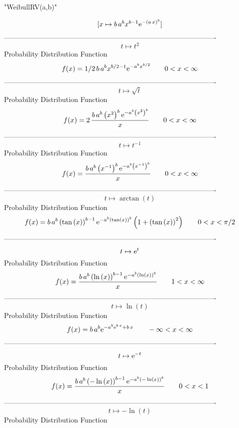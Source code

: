 \documentclass[12pt]{article}
\begin{document}
 
                              "WeibullRV(a,b)"

$$[x\mapsto b\,{a}^{b}{x}^{b-1}{{\rm e}^{- \left( a\,x \right) ^{b}}}]
$$-------------------------------------------------------------------------------------------  \\$$t\mapsto {t}^{2}
$$Probability Distribution Function 
$$  f(x)=1/2\,b\,{a}^{b}{x}^{b/2-1}{{\rm e}^{-{a}^{b}{x}^{b/2}}}
 \qquad0
 < x < \infty 
$$-------------------------------------------------------------------------------------------  \\$$t\mapsto \sqrt {t}
$$Probability Distribution Function 
$$  f(x)=2\,{\frac {b\,{a}^{b} \left( {x}^{2} \right) ^{b}{{\rm e}^{-{a}^{b}
 \left( {x}^{2} \right) ^{b}}}}{x}}
 \qquad0
 < x < \infty 
$$-------------------------------------------------------------------------------------------  \\$$t\mapsto {t}^{-1}
$$Probability Distribution Function 
$$  f(x)={\frac {b\,{a}^{b} \left( {x}^{-1} \right) ^{b}{{\rm e}^{-{a}^{b}
 \left( {x}^{-1} \right) ^{b}}}}{x}}
 \qquad0
 < x < \infty 
$$-------------------------------------------------------------------------------------------  \\$$t\mapsto \arctan \left( t \right) 
$$Probability Distribution Function 
$$  f(x)=b\,{a}^{b} \left( \tan \left( x \right)  \right) ^{b-1}{{\rm e}^{-{a}^
{b} \left( \tan \left( x \right)  \right) ^{b}}} \left( 1+ \left( \tan
 \left( x \right)  \right) ^{2} \right) 
 \qquad0
 < x < \pi/2
$$-------------------------------------------------------------------------------------------  \\$$t\mapsto {{\rm e}^{t}}
$$Probability Distribution Function 
$$  f(x)={\frac {b\,{a}^{b} \left( \ln  \left( x \right)  \right) ^{b-1}{
{\rm e}^{-{a}^{b} \left( \ln  \left( x \right)  \right) ^{b}}}}{x}}
 \qquad1
 < x < \infty 
$$-------------------------------------------------------------------------------------------  \\$$t\mapsto \ln  \left( t \right) 
$$Probability Distribution Function 
$$  f(x)=b\,{a}^{b}{{\rm e}^{-{a}^{b}{{\rm e}^{b\,x}}+b\,x}}
 \qquad-\infty 
 < x < \infty 
$$-------------------------------------------------------------------------------------------  \\$$t\mapsto {{\rm e}^{-t}}
$$Probability Distribution Function 
$$  f(x)={\frac {b\,{a}^{b} \left( -\ln  \left( x \right)  \right) ^{b-1}{
{\rm e}^{-{a}^{b} \left( -\ln  \left( x \right)  \right) ^{b}}}}{x}}
 \qquad0
 < x < 1
$$-------------------------------------------------------------------------------------------  \\$$t\mapsto -\ln  \left( t \right) 
$$Probability Distribution Function 
\end{document}
